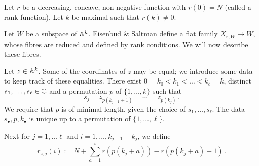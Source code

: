 \documentclass[draft]{article}
\begin{document}
Let $ r $ be a decreasing, concave, non-negative function with $r(0) = N$ (called a rank function).  Let $k $ be maximal such that $ r(k) \ne 0 $.

Let $ W$ be a subspace of $ \AA^k$. Eisenbud \& Saltman define a flat family $ X_{r,W} \rightarrow W$, whose fibres are reduced and defined by rank conditions. We will now describe these fibres.

Let $ z \in \AA^k$. Some of the coordinates of $z$ may be equal; we introduce some data to keep track of these equalities. There exist $ 0=k_0< k_1< \dots < k_\ell = k $, distinct $ s_1, \dots, s_\ell \in \CC$ and a permutation  $ p $ of $ \{1, \dots, k\}$ such that 
$$ s_j = z_{p(k_{j-1}+1)} = \cdots = z_{p(k_j)}\,. $$ We require that $ p $ is of minimal length, given the choice of $ s_1, \dots, s_\ell$.  The data $s_\bullet, p, k_\bullet$ is unique up to a permutation of $ \{1, \dots, \ell\}$.
% 
% 

Next for $ j = 1, \dots \ell $ and $ i = 1, \dots, k_{j+1} - k_j$, we define
$$
    r_{z,j}(i):= N + \sum_{a = 1}^i r(p(k_j + a)) - r(p(k_j +a) - 1)  \, . 
$$
\end{document}
